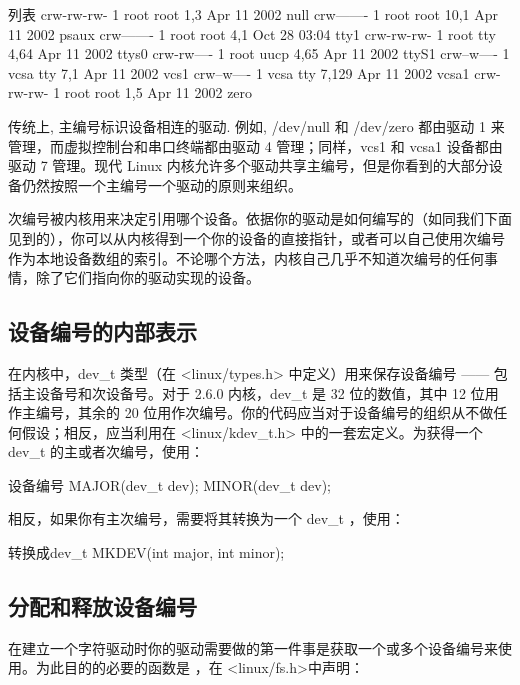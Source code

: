 \documentclass[lang=cn,newtx,10pt,scheme=chinese]{elegantbook}
\begin{document}
\begin{mycode}{列表}
crw-rw-rw- 1 root root 1,3   Apr 11 2002  null
crw------- 1 root root 10,1  Apr 11 2002  psaux
crw------- 1 root root 4,1   Oct 28 03:04 tty1
crw-rw-rw- 1 root tty  4,64  Apr 11 2002  ttys0
crw-rw---- 1 root uucp 4,65  Apr 11 2002  ttyS1
crw--w---- 1 vcsa tty  7,1   Apr 11 2002  vcs1
crw--w---- 1 vcsa tty  7,129 Apr 11 2002  vcsa1
crw-rw-rw- 1 root root 1,5   Apr 11 2002  zero
\end{mycode}

传统上, 主编号标识设备相连的驱动. 例如, /dev/null 和 /dev/zero 都由驱动 1 来管理，而虚拟控制台和串口终端都由驱动 4 管理；同样，vcs1 和 vcsa1 设备都由驱动 7 管理。现代 Linux 内核允许多个驱动共享主编号，但是你看到的大部分设备仍然按照一个主编号一个驱动的原则来组织。

次编号被内核用来决定引用哪个设备。依据你的驱动是如何编写的（如同我们下面见到的），你可以从内核得到一个你的设备的直接指针，或者可以自己使用次编号作为本地设备数组的索引。不论哪个方法，内核自己几乎不知道次编号的任何事情，除了它们指向你的驱动实现的设备。

\subsection{设备编号的内部表示}

在内核中，dev\_t 类型（在 <linux/types.h> 中定义）用来保存设备编号 —— 包括主设备号和次设备号。对于 2.6.0 内核，dev\_t 是 32 位的数值，其中 12 位用作主编号，其余的 20 位用作次编号。你的代码应当对于设备编号的组织从不做任何假设；相反，应当利用在 <linux/kdev\_t.h> 中的一套宏定义。为获得一个 dev\_t 的主或者次编号，使用：

\begin{mycode}{设备编号}
MAJOR(dev_t dev);
MINOR(dev_t dev);
\end{mycode}

相反，如果你有主次编号，需要将其转换为一个 dev\_t ，使用：

\begin{mycode}{转换成dev\_t}
MKDEV(int major, int minor);
\end{mycode}

\subsection{分配和释放设备编号}

在建立一个字符驱动时你的驱动需要做的第一件事是获取一个或多个设备编号来使用。为此目的的必要的函数是 ，在 <linux/fs.h>中声明：
\end{document}
